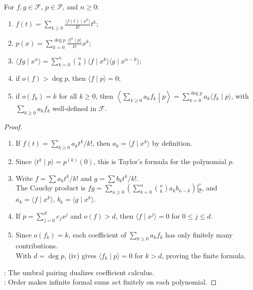\begin{proposition} \label{prop:umbral-algebra-basic-identities} \\
For $f,g\in\mathscr{F}$, $p\in\mathscr{P}$, and $n\geq0$:
\begin{enumerate}[label=(\roman*)]
\setlength{\itemsep}{0pt}
\item $\displaystyle f(t)=\sum_{k\geq0}\frac{\langle f(t)\mid x^k\rangle}{k!}t^k$;
\item $\displaystyle p(x)=\sum_{k=0}^{\deg p}\frac{\langle t^k\mid p\rangle}{k!}x^k$;
\item $\displaystyle \langle fg\mid x^n\rangle =\sum\limits_{k=0}^{n}\binom{n}{k} \langle f\mid x^k\rangle \langle g\mid x^{n-k}\rangle$;
\item if $o(f)>\deg p$, then $\langle f\mid p\rangle=0$;
\item if $o(f_k)=k$ for all $k\geq0$, then $\left\langle\sum\limits_{k\geq0}a_kf_k\middle|p\right\rangle =\sum\limits_{k=0}^{\deg p}a_k\langle f_k\mid p\rangle$, with $\sum\limits_{k\geq0}a_kf_k$ well-defined in $\mathscr{F}$.
\end{enumerate}
\begin{proof}
\begin{enumerate}[label=(\roman*)]
\setlength{\itemsep}{0pt}
\item If $f(t)=\sum\limits_{k\geq0}a_kt^k/k!$, then $a_k=\langle f\mid x^k\rangle$ by definition.
\item Since $\langle t^k\mid p\rangle=p^{(k)}(0)$, this is Taylor's formula
for the polynomial $p$.
\item Write $f=\sum a_kt^k/k!$ and $g=\sum b_kt^k/k!$.\\
The Cauchy product is $fg=\sum\limits_{n\geq0} \left(\sum\limits_{k=0}^{n}\binom{n}{k}a_kb_{n-k}\right)\frac{t^n}{n!}$, and $a_k=\langle f\mid x^k\rangle$, $b_k=\langle g\mid x^k\rangle$.
\item If $p=\sum\limits_{j=0}^{d}c_jx^j$ and $o(f)>d$, then $\langle f\mid x^j\rangle=0$ for $0\leq j\leq d$.
\item Since $o(f_k)=k$, each coefficient of $\sum\limits_{k\geq0}a_kf_k$ has only finitely many contributions.\\
With $d=\deg p$, (iv) gives $\langle f_k\mid p\rangle=0$ for $k>d$, proving the finite formula.
\end{enumerate}
: The umbral pairing dualizes coefficient calculus.\\
: Order makes infinite formal sums act finitely on each polynomial.
\end{proof}
\end{proposition}

